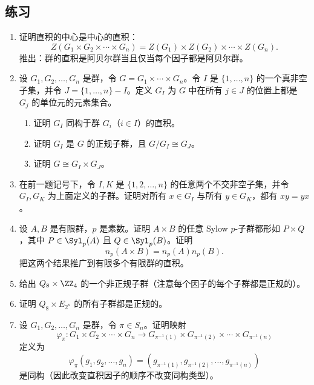 \subsection*{练习}
\begin{enumerate}[label=\arabic*.]
  \item 证明直积的中心是中心的直积：
  \[
    Z(G_1\times G_2\times\cdots\times G_n)=Z(G_1)\times Z(G_2)\times\cdots\times Z(G_n).
  \]
  推出：群的直积是阿贝尔群当且仅当每个因子都是阿贝尔群。

  \item 设 $G_1,G_2,\ldots,G_n$ 是群，令 $G=G_1\times\cdots\times G_n$。令 $I$ 是 $\{1,\ldots,n\}$ 的一个真非空子集，并令 $J=\{1,\ldots,n\}-I$。定义 $G_I$ 为 $G$ 中在所有 $j\in J$ 的位置上都是 $G_j$ 的单位元的元素集合。
  \begin{enumerate}[label=(\alph*)]
    \item 证明 $G_I$ 同构于群 $G_i$（$i\in I$）的直积。
    \item 证明 $G_I$ 是 $G$ 的正规子群，且 $G/G_I\cong G_J$。
    \item 证明 $G\cong G_I\times G_J$。
  \end{enumerate}

  \item 在前一题记号下，令 $I,K$ 是 $\{1,2,\ldots,n\}$ 的任意两个不交非空子集，并令 $G_I,G_K$ 为上面定义的子群。证明对所有 $x\in G_I$ 与所有 $y\in G_K$，都有 $xy=yx$。

  \item 设 $A,B$ 是有限群，$p$ 是素数。证明 $A\times B$ 的任意 Sylow $p$-子群都形如 $P\times Q$，其中 $P\in\Syl_p(A)$ 且 $Q\in\Syl_p(B)$。证明
  \[
    n_p(A\times B)=n_p(A)n_p(B).
  \]
  把这两个结果推广到有限多个有限群的直积。

  \item 给出 $Q_8\times \ZZ_4$ 的一个非正规子群（注意每个因子的每个子群都是正规的）。

  \item 证明 $Q_8\times E_{2^n}$ 的所有子群都是正规的。

  \item 设 $G_1,G_2,
\ldots,G_n$ 是群，令 $\pi\in S_n$。证明映射
  \[
    \varphi_\pi:G_1\times G_2\times\cdots\times G_n
    \longrightarrow G_{\pi^{-1}(1)}\times G_{\pi^{-1}(2)}\times\cdots\times G_{\pi^{-1}(n)}
  \]
  定义为
  \[
    \varphi_\pi(g_1,g_2,\ldots,g_n)=(g_{\pi^{-1}(1)},g_{\pi^{-1}(2)},\ldots,g_{\pi^{-1}(n)})
  \]
  是同构（因此改变直积因子的顺序不改变同构类型）。


\end{enumerate}
